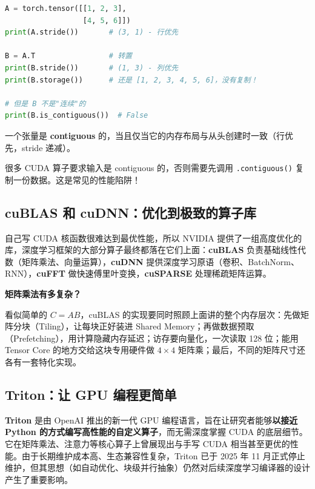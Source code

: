 \begin{lstlisting}[style=teaching, language=Python]
A = torch.tensor([[1, 2, 3],
                  [4, 5, 6]])
print(A.stride())       # (3, 1) - 行优先

B = A.T                 # 转置
print(B.stride())       # (1, 3) - 列优先
print(B.storage())      # 还是 [1, 2, 3, 4, 5, 6]，没有复制！

# 但是 B 不是"连续"的
print(B.is_contiguous())  # False
\end{lstlisting}

\begin{insightbox}[title=Contiguous 的含义]
一个张量是 \textbf{contiguous} 的，当且仅当它的内存布局与从头创建时一致（行优先，stride 递减）。

很多 CUDA 算子要求输入是 contiguous 的，否则需要先调用 \texttt{.contiguous()} 复制一份数据。这是常见的性能陷阱！
\end{insightbox}

\subsection*{cuBLAS 和 cuDNN：优化到极致的算子库}

自己写 CUDA 核函数很难达到最优性能，所以 NVIDIA 提供了一组高度优化的库，深度学习框架的大部分算子最终都落在它们上面：\textbf{cuBLAS} 负责基础线性代数（矩阵乘法、向量运算），\textbf{cuDNN} 提供深度学习原语（卷积、BatchNorm、RNN），\textbf{cuFFT} 做快速傅里叶变换，\textbf{cuSPARSE} 处理稀疏矩阵运算。

\textbf{矩阵乘法有多复杂？}

看似简单的 $C = AB$，cuBLAS 的实现要同时照顾上面讲的整个内存层次：先做矩阵分块（Tiling），让每块正好装进 Shared Memory；再做数据预取（Prefetching），用计算隐藏内存延迟；访存要向量化，一次读取 128 位；能用 Tensor Core 的地方交给这块专用硬件做 $4 \times 4$ 矩阵乘；最后，不同的矩阵尺寸还各有一套特化实现。



\subsection*{Triton：让 GPU 编程更简单}

\textbf{Triton} 是由 OpenAI 推出的新一代 GPU 编程语言，旨在让研究者能够\textbf{以接近 Python 的方式编写高性能的自定义算子}，而无需深度掌握 CUDA 的底层细节。它在矩阵乘法、注意力等核心算子上曾展现出与手写 CUDA 相当甚至更优的性能。由于长期维护成本高、生态兼容性复杂，Triton 已于 2025 年 11 月正式停止维护，但其思想（如自动优化、块级并行抽象）仍然对后续深度学习编译器的设计产生了重要影响。


